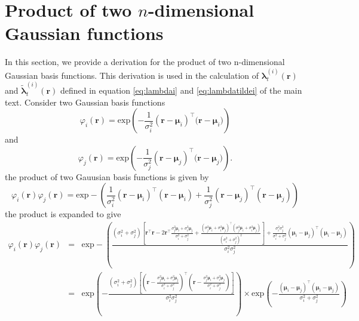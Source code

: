 \documentclass[]{article}
\begin{document}
\ifpdf
{}
\else
{}
\fi

\renewcommand{\theequation}{S1.\arabic{equation}}
\section*{Product of two $n$-dimensional Gaussian functions}\label{sec:GaussianProduct} 
In this section, we provide a derivation for the product of two n-dimensional Gaussian basis functions.
This derivation is used in the  calculation of $\boldsymbol\lambda_t^{(i)}\left(\mathbf r\right)$ and $\tilde{\boldsymbol\lambda}_t^{(i)}\left(\mathbf r\right)$ defined in equation \ref{eq:lambdai} and \ref{eq:lambdatildei} of the main text. Consider two
Gaussian basis functions
\begin{equation}\label{eq:n_dimensional_Gaussian1}
 \varphi_i(\mathbf r)=\mathrm{exp}\left({-\frac{1}{\sigma_i^2} (\mathbf r-\boldsymbol \mu_i)^\top(\mathbf r-\boldsymbol \mu_i})\right)
\end{equation}
and 
\begin{equation}\label{eq:n_dimensional_Gaussian2}
\varphi_j(\mathbf r)=\mathrm{exp}\left({-\frac{1}{\sigma_j^2} (\mathbf r-\boldsymbol \mu_j)^\top(\mathbf r-\boldsymbol \mu_j})\right).
\end{equation}
the product of two Gauusian basis functions is given by
\begin{equation}
 \varphi_i(\mathbf r)\varphi_j(\mathbf r)=\mathrm{exp}-\left({\frac{1}{\sigma_i^2} (\mathbf r-\boldsymbol \mu_i)^\top(\mathbf r-\boldsymbol\mu_i)+{\frac{1}{\sigma_j^2} (\mathbf r-\boldsymbol \mu_j)^\top(\mathbf r-\boldsymbol\mu_j)}}\right)
\end{equation}
the product is expanded to give
\begin{equation}
\begin{array}{ccc}
 
 \varphi_i(\mathbf r)\varphi_j(\mathbf r)&=&\mathrm{exp}-\left(\frac{(\sigma_i^2+\sigma_j^2)\left[\mathbf r^\top\mathbf r-2\mathbf r^\top \frac{\sigma_j^2\boldsymbol\mu_i+\sigma_i^2\boldsymbol\mu_j}{\sigma_i^2+\sigma_j^2}+\frac{(\sigma_j^2\boldsymbol\mu_i+\sigma_i^2\boldsymbol\mu_j)^\top(\sigma_j^2\boldsymbol\mu_i+\sigma_i^2\boldsymbol\mu_j)}{(\sigma_i^2+\sigma_j^2)^2}   \right]  +\frac{\sigma_i^2\sigma_j^2}{\sigma_i^2+\sigma_j^2}(\boldsymbol \mu_i-\boldsymbol\mu_j)^\top(\boldsymbol \mu_i-\boldsymbol\mu_j) }{\sigma_i^2\sigma_j^2}\right)\\
&=&\mathrm{exp}\left(-\frac{(\sigma_i^2+\sigma_j^2)\left[(\mathbf r-\frac{\sigma_j^2\boldsymbol\mu_i+\sigma_i^2\boldsymbol\mu_j}{\sigma_i^2+\sigma_j^2})^\top(\mathbf r-\frac{\sigma_j^2\boldsymbol\mu_i+\sigma_i^2\boldsymbol\mu_j}{\sigma_i^2+\sigma_j^2})\right]  }{\sigma_i^2\sigma_j^2}\right)
\times\mathrm{exp}\left(-\frac{(\boldsymbol \mu_i-\boldsymbol\mu_j)^\top(\boldsymbol \mu_i-\boldsymbol\mu_j)}{\sigma_i^2+\sigma_j^2}\right)
\end{array}
\end{equation}
\end{document}
